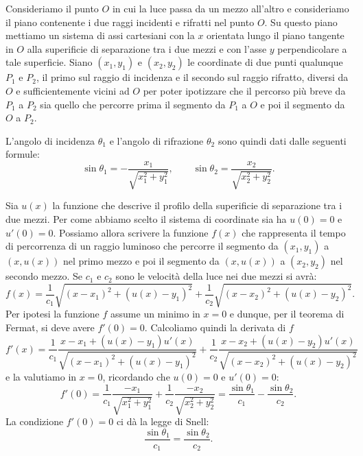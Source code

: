 \begin{exercise}
Consideriamo il punto $O$ in cui la luce passa da un mezzo all'altro
e consideriamo il piano contenente i due raggi incidenti e rifratti nel 
punto $O$. Su questo piano mettiamo un sistema di assi cartesiani 
con la $x$ orientata lungo il piano tangente in $O$ alla superificie 
di separazione tra i due mezzi e con l'asse $y$ perpendicolare 
a tale superficie. 
Siano $(x_1,y_1)$ e $(x_2,y_2)$ le coordinate di due punti qualunque $P_1$ e $P_2$, 
il primo sul raggio di incidenza e il secondo sul raggio rifratto, diversi da $O$
e sufficientemente vicini ad $O$ per poter ipotizzare che il percorso 
più breve da $P_1$ a $P_2$ sia quello che percorre prima il segmento 
da $P_1$ a $O$ e poi il segmento da $O$ a $P_2$.

L'angolo di incidenza $\theta_1$ e l'angolo di rifrazione $\theta_2$
sono quindi dati dalle seguenti formule:
\[
  \sin \theta_1 = -\frac{x_1}{\sqrt{x_1^2+y_1^2}},\qquad
  \sin \theta_2 = \frac{x_2}{\sqrt{x_2^2+y_2^2}}.
\]

Sia $u(x)$ la funzione che descrive il profilo della superificie 
di separazione tra i due mezzi. Per come abbiamo scelto il sistema di 
coordinate sia ha $u(0)=0$ e $u'(0)=0$. 
Possiamo allora scrivere la funzione $f(x)$ che rappresenta
il tempo di percorrenza di un raggio luminoso che percorre 
il segmento da $(x_1,y_1)$ a $(x,u(x))$ nel primo mezzo e poi 
il segmento da $(x,u(x))$ a $(x_2,y_2)$ nel secondo mezzo.
Se $c_1$ e $c_2$ sono le velocità della luce nei due mezzi 
si avrà:
\[
  f(x) = \frac{1}{c_1} \sqrt{(x - x_1)^2 + (u(x) - y_1)^2} +
         \frac{1}{c_2} \sqrt{(x - x_2)^2 + (u(x) - y_2)^2}.
\]
Per ipotesi la funzione $f$ assume un minimo in $x=0$ 
e dunque, per il teorema di Fermat, si deve avere $f'(0)=0$.
Calcoliamo quindi la derivata di $f$ 
\[
  f'(x) = \frac{1}{c_1}\frac{x - x_1 + (u(x)-y_1)u'(x)}{\sqrt{(x-x_1)^2 + (u(x)-y_1)^2}} +
          \frac{1}{c_2}\frac{x - x_2 + (u(x)-y_2)u'(x)}{\sqrt{(x-x_2)^2 + (u(x)-y_2)^2}}
\]
e la valutiamo in $x=0$, 
ricordando che $u(0)=0$ e $u'(0)=0$:
\[
  f'(0) = \frac{1}{c_1}\frac{- x_1}{\sqrt{x_1^2 + y_1^2}} +
          \frac{1}{c_2}\frac{- x_2}{\sqrt{x_2^2 + y_2^2}}
        = \frac{\sin \theta_1}{c_1} - \frac{\sin \theta_2}{c_2}.
\]
La condizione $f'(0)=0$ ci dà la legge di Snell:
\[
  \frac{\sin \theta_1}{c_1} = \frac{\sin \theta_2}{c_2}.
\]
\end{exercise}

